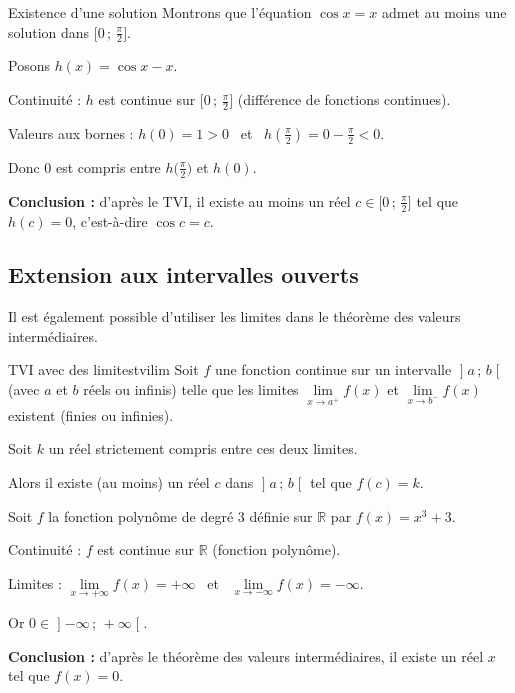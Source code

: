 \documentclass[11pt,a4paper]{article}
\newcommand{\R}{\mathbb{R}}
\newcommand{\intff}[2]{\mathopen{[}#1\,;\,#2\mathclose{]}}
\newcommand{\intoo}[2]{\mathopen{]}#1\,;\,#2\mathclose{[}}
\newcommand{\limite}[2]{\lim\limits_{#1}#2}
\newcommand{\limg}[2]{\lim\limits_{x\to #1^-}#2}
\newcommand{\limd}[2]{\lim\limits_{x\to #1^+}#2}
\begin{document}
\begin{exemple}{Existence d'une solution}{}
Montrons que l'équation $\cos x = x$ admet au moins une solution dans
$\intff{0}{\frac{\pi}{2}}$.

Posons $h(x)=\cos x - x$.
\begin{etapes}
  \item Continuité : $h$ est continue sur $\intff{0}{\frac{\pi}{2}}$
        (différence de fonctions continues).
  \item Valeurs aux bornes : $h(0)=1>0$ \ et \
        $h\!\left(\frac{\pi}{2}\right)=0-\frac{\pi}{2}<0$.
  \item Donc $0$ est compris entre $h\big(\frac{\pi}{2}\big)$ et $h(0)$.
\end{etapes}
\textbf{Conclusion :} d'après le TVI, il existe au moins un réel
$c\in\intff{0}{\frac{\pi}{2}}$ tel que $h(c)=0$, c'est-à-dire $\cos c=c$.
\end{exemple}

\subsection{Extension aux intervalles ouverts}

Il est également possible d'utiliser les limites dans le théorème des valeurs
intermédiaires.

\begin{theoreme}{TVI avec des limites}{tvilim}
Soit $f$ une fonction continue sur un intervalle $\intoo{a}{b}$ (avec $a$ et $b$
réels ou infinis) telle que les limites $\limd{a}{f(x)}$ et $\limg{b}{f(x)}$
existent (finies ou infinies).

Soit $k$ un réel strictement compris entre ces deux limites.

Alors il existe (au moins) un réel $c$ dans $\intoo{a}{b}$ tel que $f(c)=k$.
\end{theoreme}

\begin{exemple}{}{}
Soit $f$ la fonction polynôme de degré $3$ définie sur $\R$ par $f(x)=x^3+3$.
\begin{etapes}
  \item Continuité : $f$ est continue sur $\R$ (fonction polynôme).
  \item Limites : $\limite{x\to+\infty}{f(x)}=+\infty$ \ et \
        $\limite{x\to-\infty}{f(x)}=-\infty$.
  \item Or $0\in\intoo{-\infty}{+\infty}$.
\end{etapes}
\textbf{Conclusion :} d'après le théorème des valeurs intermédiaires, il existe
un réel $x$ tel que $f(x)=0$.
\end{exemple}
\end{document}
